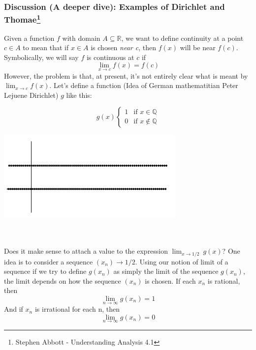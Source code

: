 \documentclass[12pt]{article}
\begin{document}
\subsubsection*{Discussion (A deeper dive): Examples of Dirichlet and Thomae\footnote{Stephen Abbott - Understanding Analysis 4.1}}
Given a function $f$ with domain $A \subseteq \mathbb{R}$, we want to define continuity at a point $c \in A$ to mean that if $x \in A$ is chosen \textit{near c}, then $f(x)$ will be near $f(c)$. \\
Symbolically, we will say $f$ is continuous at $c$ if
$$ \lim_{x \to c} f(x) = f(c) $$
However, the problem is that, at present, it's not entirely clear what is meant by $ \lim_{x \to c} f(x) $. Let's define a function (Idea of German mathematitian Peter Lejuene Dirichlet) $g$ like this:\\
\begin{minipage}{0.45\textwidth}
    \begin{equation*}
        g(x)
        \begin{cases}
            1 & \text{if } x \in \mathbb{Q} \\
            0 & \text{if } x \notin \mathbb{Q}
        \end{cases}
    \end{equation*}
\end{minipage}
\begin{minipage}{0.45\textwidth}
    \centering
    \includegraphics[scale=0.4]{Dirichlet g_x.png}
\end{minipage} \\~\\
Does it make sense to attach a value to the expression $\lim_{x \to 1/2} \ g(x)$? One idea is to consider a sequence $(x_n) \to 1/2$. Using our notion of limit of a sequence if we try to define $g(x_n)$  as simply the limit of the sequence $g(x_n)$, the limit depends on how the sequence $(x_n)$ is chosen. If each $x_n$ is rational, then \[
    \lim_{n \to \infty} g(x_n) = 1
\]
And if $x_n$ is irrational for each n, then \[
    \lim_{n \to \infty} g(x_n) = 0
\]
\end{document}
